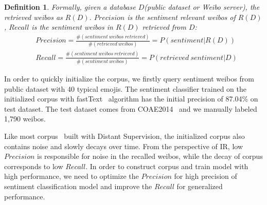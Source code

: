 \documentclass[runningheads]{llncs}
\begin{document}
\newtheorem{myDef}{Definition}

\begin{myDef}
Formally, given a database $D$(public dataset or Weibo server), the retrieved weibos as $R(D)$.  $Precision$ is the sentiment relevant weibos of $R(D)$, $Recall$ is the sentiment weibos in $R(D)$ retrieved from $D$:
\scriptsize{ %
\begin{align}
&Precision = \frac{\#\left ( sentiment\ weibos\ retrieved \right )}{\#\left ( retrieved\ weibos \right )} = P\left ( sentiment | R(D) \right ) \\
&Recall = \frac{\#\left ( sentiment\ weibos\ retrieved \right )}{\#\left ( sentiment\ weibos \right )} = P\left (retrieved\ sentiment | D\right )
\end{align}
} %
\end{myDef}

In order to quickly initialize the corpus, we firstly query sentiment weibos from public dataset with 40 typical emojis. The sentiment classifier trained on the initialized corpus with fastText~\cite{joulin2016bag} algorithm has the initial precision of 87.04\% on test dataset. The test dataset comes from COAE2014~\cite{Yang2015Task} and we manually labeled 1,790 weibos.

Like most corpus~\cite{go2009twitter,pak2010twitter,iosifidis2017large} built with Distant Supervision, the initialized corpus also contains noise and slowly decays over time. From the perspective of IR, low $Precision$ is responsible for noise in the recalled weibos, while the decay of corpus corresponds to low $Recall$. In order to construct corpus and train model with high performance, we need to optimize the $Precision$ for high precision of sentiment classification model and improve the $Recall$ for generalized performance.

\end{document}
